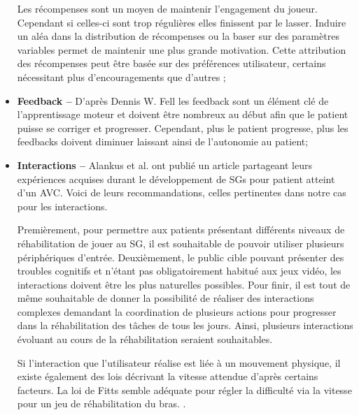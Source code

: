 \begin{itemize}
		Les récompenses sont un moyen de maintenir l'engagement du joueur. Cependant si celles-ci sont trop régulières elles finissent par le lasser. Induire un aléa dans la distribution de récompenses ou la baser sur des paramètres variables permet de maintenir une plus grande motivation. Cette attribution des récompenses peut être basée sur des préférences utilisateur, certains nécessitant plus d'encouragements que d'autres \cite{Nagle_PlayerCenteredRewardScheduling};
		
		\item \textbf{Feedback --} D'après Dennis W. Fell \cite{Fell_ProgressingTherapeuticInvervention} les feedback sont un élément clé de l'apprentissage moteur et doivent être nombreux au début afin que le patient puisse se corriger et progresser. Cependant, plus le patient progresse, plus les feedbacks doivent diminuer laissant ainsi de l'autonomie au patient;
		
		\item \textbf{Interactions --} Alankus et al. ont publié un article \cite{Alankus_TowardsCustomizableGames} partageant leurs expériences acquises durant le développement de SGs pour patient atteint d'un AVC. Voici de leurs recommandations, celles pertinentes dans notre cas pour les interactions.
			
		Premièrement, pour permettre aux patients présentant différents niveaux de réhabilitation de jouer au SG, il est souhaitable de pouvoir utiliser plusieurs périphériques d'entrée.	Deuxièmement, le public cible pouvant présenter des troubles cognitifs et n'étant pas obligatoirement habitué aux jeux vidéo, les interactions doivent être les plus naturelles possibles. Pour finir, il est tout de même souhaitable de donner la possibilité de réaliser des interactions complexes demandant la coordination de plusieurs actions pour progresser dans la réhabilitation des tâches de tous les jours. Ainsi, plusieurs interactions évoluant au cours de la réhabilitation seraient souhaitables. 
		
		Si l'interaction que l'utilisateur réalise est liée à un mouvement physique, il existe également des lois décrivant la vitesse attendue d'après certains facteurs. La loi de Fitts semble adéquate pour régler la difficulté via la vitesse pour un jeu de réhabilitation du bras. \cite{Zimmerli_ValidationBalanceDifficulty}.
	\end{itemize}	
